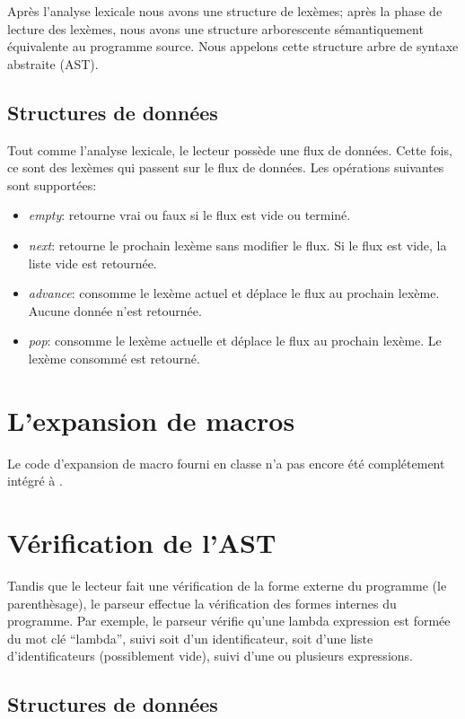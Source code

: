 \documentclass[11pt]{report}
\begin{document}
Après l'analyse lexicale nous avons une structure de lexèmes; après la phase
de lecture des lexèmes, nous avons une structure arborescente sémantiquement
équivalente au programme source. Nous appelons cette structure arbre de
syntaxe abstraite (AST).

\subsection{Structures de données}

Tout comme l'analyse lexicale, le lecteur possède une flux de
données.  Cette fois, ce sont des lexèmes qui passent sur le flux de
données.  Les opérations suivantes sont supportées:

\begin{itemize}
\item \emph{empty}: retourne vrai ou faux si le flux est vide ou terminé.
\item \emph{next}: retourne le prochain lexème sans modifier le flux.
  Si le flux est vide, la liste vide est retournée.
\item \emph{advance}: consomme le lexème actuel et déplace le flux au
  prochain lexème.  Aucune donnée n'est retournée.
\item \emph{pop}: consomme le lexème actuelle et déplace le flux au
  prochain lexème.  Le lexème consommé est retourné.
\end{itemize}

\section{L'expansion de macros}

Le code d'expansion de macro fourni en classe n'a pas encore été complétement
intégré à \sins{}.

\section{Vérification de l'AST}

Tandis que le lecteur fait une vérification de la forme externe du programme
(le parenthèsage), le parseur effectue la vérification des formes internes du
programme. Par exemple, le parseur vérifie qu'une lambda expression est formée
du mot clé ``lambda'', suivi soit d'un identificateur, soit d'une liste
d'identificateurs (possiblement vide), suivi d'une ou plusieurs expressions.

\subsection{Structures de données}
\end{document}
